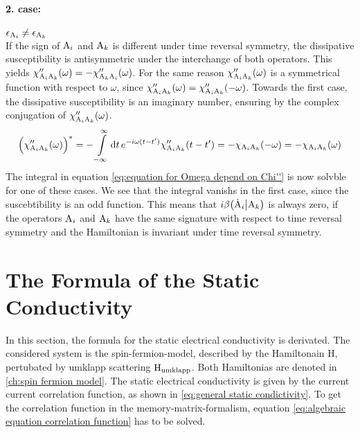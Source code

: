 \paragraph{2. case:} $\epsilon_{\mathrm{A}_{i}} \neq \epsilon_{\mathrm{A}_{k}}$\\
%
If the sign of $\mathrm{A}_{i}$ and $\mathrm{A}_{k}$ is different under time reversal symmetry, the dissipative susceptibility is antisymmetric under the interchange of both operators.
This yields $\chi''_{\mathrm{A}_{i} \mathrm{A}_{k}}(\omega) = -\chi''_{\mathrm{A}_{k} \mathrm{A}_{i}}(\omega)$.
For the same reason $\chi''_{\mathrm{A}_{i} \mathrm{A}_{k}}(\omega)$ is a symmetrical function with respect to $\omega$, since $\chi''_{\mathrm{A}_{i} \mathrm{A}_{k}}(\omega) = \chi''_{\mathrm{A}_{i} \mathrm{A}_{k}}(-\omega)$.
Towards the first case, the dissipative susceptibility is an imaginary number, ensuring by the complex conjugation of $\chi''_{\mathrm{A}_{i} \mathrm{A}_{k}}(\omega)$.
%
\begin{align}
	\Big(\chi''_{\mathrm{A}_{i} \mathrm{A}_{k}}(\omega)\Big)^{*} = -\int\limits_{-\infty}^{\infty} \dd{t} e^{-i\omega(t-t')} \chi''_{\mathrm{A}_{i} \mathrm{A}_{k}}(t-t') = -\chi_{\mathrm{A}_{i} \mathrm{A}_{k}}(-\omega) = -\chi_{\mathrm{A}_{i} \mathrm{A}_{k}}(\omega)
\end{align}
%
The integral in equation \eqref{eq:equation for Omega depend on Chi''} is now solvble for one of these cases.
We see that the integral vanishs in the first case, since the suscebtibility is an odd function.
This means that $i \beta \big({\dot{\mathrm{A}}_{i}}\big|{\mathrm{A}_{k}}\big)$ is always zero, if the operators $\mathrm{A}_{i}$ and $\mathrm{A}_{k}$ have the same signature with respect to time reversal symmetry and the Hamiltonian is invariant under time reversal symmetry.

%
%
\section{The Formula of the Static Conductivity}
\label{sec:formula static conductivity}
%
%
In this section, the formula for the static electrical conductivity is derivated.
The considered system is the spin-fermion-model, described by the Hamiltonain H, pertubated by umklapp scattering $\mathrm{H}_{\mathrm{umklapp}}$.
Both Hamiltonias are denoted in \ref{ch:spin fermion model}.
The static electrical conductivity is given by the current current correlation function, as shown in \eqref{eq:general static condictivity}.
To get the correlation function in the memory-matrix-formalism, equation \eqref{eq:algebraic equation correlation function} has to be solved.

